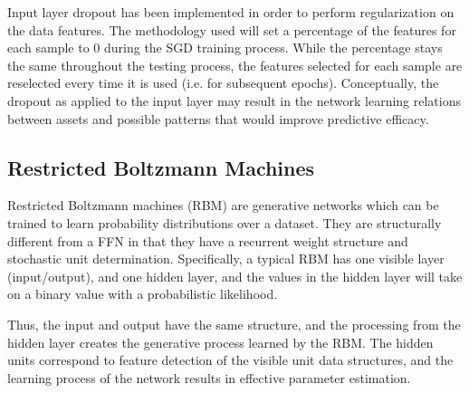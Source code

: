 \documentclass[a4paper,11pt,oneside]{article}
\theoremstyle{plain}
\theoremstyle{definition}
\begin{document}
	Input layer dropout has been implemented in order to perform regularization on the data features. The methodology used will set a percentage of the features for each sample to 0 during the SGD training process. While the percentage stays the same throughout the testing process, the features selected for each sample are reselected every time it is used (i.e. for subsequent epochs). Conceptually, the dropout as applied to the input layer may result in the network learning relations between assets and possible patterns that would improve predictive efficacy.
	
	\subsection{Restricted Boltzmann Machines}\label{imp_rbm}
	
	Restricted Boltzmann machines (RBM) are generative networks which can be trained to learn probability distributions over a dataset. They are structurally different from a FFN in that they have a recurrent weight structure and stochastic unit determination. Specifically, a typical RBM has one visible layer (input/output), and one hidden layer, and the values in the hidden layer will take on a binary value with a probabilistic likelihood.  \newline
	
	Thus, the input and output have the same structure, and the processing from the hidden layer creates the generative process learned by the RBM. The hidden units correspond to feature detection of the visible unit data structures, and the learning process of the network results in effective parameter estimation. \newline
	
\end{document}
